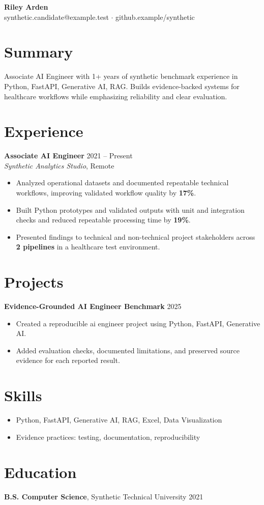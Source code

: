 \documentclass[10pt,letterpaper]{article}
\begin{document}
\begin{center}
{\Large \textbf{Riley Arden}}\\
synthetic.candidate@example.test $\cdot$ github.example/synthetic
\end{center}

\section*{Summary}
Associate AI Engineer with 1+ years of synthetic benchmark experience in Python, FastAPI, Generative AI, RAG. Builds evidence-backed systems for healthcare workflows while emphasizing reliability and clear evaluation.

\section*{Experience}
\textbf{Associate AI Engineer} \hfill 2021 -- Present\\
\textit{Synthetic Analytics Studio}, Remote
\begin{itemize}
  \item Analyzed operational datasets and documented repeatable technical workflows, improving validated workflow quality by \textbf{17\%}.
  \item Built Python prototypes and validated outputs with unit and integration checks and reduced repeatable processing time by \textbf{19\%}.
  \item Presented findings to technical and non-technical project stakeholders across \textbf{2 pipelines} in a healthcare test environment.
\end{itemize}

\section*{Projects}
\textbf{Evidence-Grounded AI Engineer Benchmark} \hfill 2025
\begin{itemize}
  \item Created a reproducible ai engineer project using Python, FastAPI, Generative AI.
  \item Added evaluation checks, documented limitations, and preserved source evidence for each reported result.
\end{itemize}

\section*{Skills}
\begin{itemize}
  \item Python, FastAPI, Generative AI, RAG, Excel, Data Visualization
  \item Evidence practices: testing, documentation, reproducibility
\end{itemize}

\section*{Education}
\textbf{B.S. Computer Science}, Synthetic Technical University \hfill 2021
\end{document}
